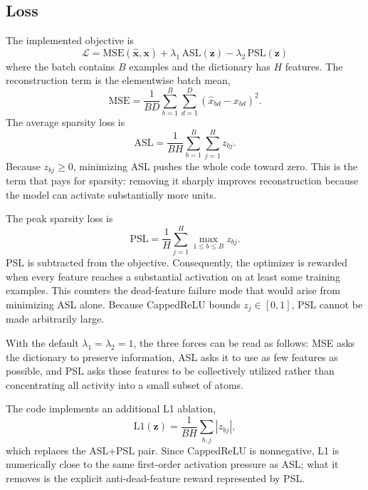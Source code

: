\documentclass[conference]{IEEEtran}
\begin{document}
\subsection{Loss}
The implemented objective is
\begin{equation}
\mathcal{L} = \mathrm{MSE}(\hat{\mathbf{x}},\mathbf{x})
+ \lambda_{1}\,\mathrm{ASL}(\mathbf{z}) - \lambda_{2}\,\mathrm{PSL}(\mathbf{z})
\label{eq:loss}
\end{equation}
where the batch contains $B$ examples and the dictionary has $H$ features.
The reconstruction term is the elementwise batch mean,
\begin{equation}
\mathrm{MSE} = \frac{1}{BD}\sum_{b=1}^{B}\sum_{d=1}^{D}
(\hat{x}_{bd}-x_{bd})^2.
\label{eq:mse}
\end{equation}
The average sparsity loss is
\begin{equation}
\mathrm{ASL} = \frac{1}{BH}\sum_{b=1}^{B}\sum_{j=1}^{H} z_{bj}.
\label{eq:asl}
\end{equation}
Because $z_{bj}\ge 0$, minimizing ASL pushes the whole code toward zero.
This is the term that pays for sparsity: removing it sharply improves
reconstruction because the model can activate substantially more units.

The peak sparsity loss is
\begin{equation}
\mathrm{PSL} = \frac{1}{H}\sum_{j=1}^{H}\max_{1\le b\le B} z_{bj}.
\label{eq:psl}
\end{equation}
PSL is subtracted from the objective. Consequently, the optimizer is
rewarded when every feature reaches a substantial activation on at least
some training examples. This counters the dead-feature failure mode that
would arise from minimizing ASL alone. Because CappedReLU bounds
$z_j\in[0,1]$, PSL cannot be made arbitrarily large.

With the default $\lambda_1=\lambda_2=1$, the three forces can be read as
follows: MSE asks the dictionary to preserve information, ASL asks it to
use as few features as possible, and PSL asks those features to be
collectively utilized rather than concentrating all activity into a small
subset of atoms.

The code implements an additional L1 ablation,
\begin{equation}
\mathrm{L1}(\mathbf{z}) = \frac{1}{BH}\sum_{b,j} |z_{bj}|,
\label{eq:l1}
\end{equation}
which replaces the ASL+PSL pair. Since CappedReLU is nonnegative, L1 is
numerically close to the same first-order activation pressure as ASL; what
it removes is the explicit anti-dead-feature reward represented by PSL.
\end{document}
